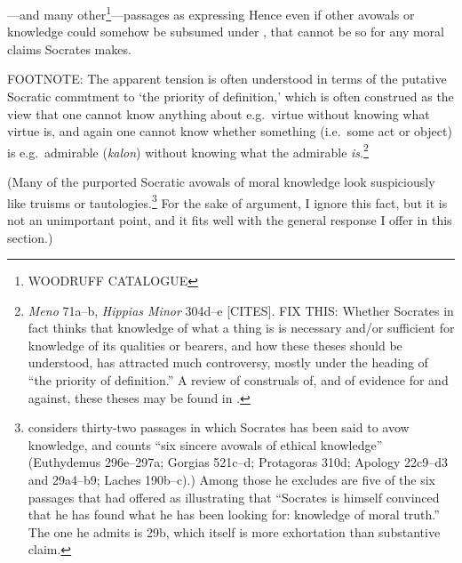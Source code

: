\documentclass[11pt,letterpaper,oneside]{amsart} %
\begin{document}
---and many other\footnote{WOODRUFF CATALOGUE}---passages as expressing  Hence even if other avowals or knowledge could somehow be subsumed under \techne, that cannot be so for any moral claims Socrates makes.








FOOTNOTE: The apparent tension is often understood in terms of the putative Socratic commtment to `the priority of definition,' which is often construed as the view that one cannot know anything about e.g.\ virtue without knowing what virtue is, and again one cannot know whether something (i.e.\ some act or object) is e.g.\ admirable (\emph{kalon}) without knowing what the admirable \emph{is}.\footnote{\emph{Meno} 71a--b, \emph{Hippias Minor} 304d--e [CITES]. FIX THIS: Whether Socrates in fact thinks that knowledge of what a thing is is necessary and/or sufficient for knowledge of its qualities or bearers, and how these theses should be understood, has attracted much controversy, mostly under the heading of ``the priority of definition.'' A review of construals of, and of evidence for and against, these theses may be found in  \citet[chs.\ 6 \& 7]{benson2000swm}.} 










(Many of the purported Socratic avowals of moral knowledge look suspiciously like truisms or tautologies.\footnote{\citet[p.\ 84]{wolfsdorf2004socrates} considers thirty-two passages in which Socrates has been said to avow knowledge, and counts ``six sincere avowals of ethical knowledge'' (Euthydemus 296e--297a; Gorgias 521c--d; Protagoras 310d; Apology 22c9--d3 and 29a4--b9; Laches 190b--c).) Among those he excludes are five of the six passages that \citet[73]{vlastos1985sdk} had offered as illustrating that ``Socrates is himself convinced that he has found what he has been looking for: knowledge of moral truth.'' The one he admits is  29b, which itself is more exhortation than substantive claim.} For the sake of argument, I ignore this fact, but it is not an unimportant point, and it fits well with the general response I offer in this section.)
\end{document}
